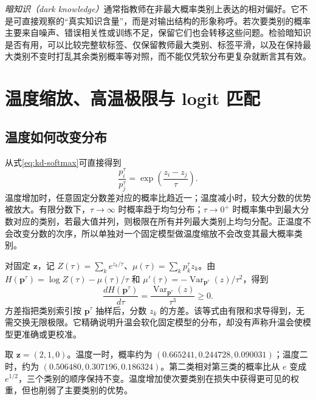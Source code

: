 \documentclass[UTF8,12pt,a4paper,fontset=fandol]{ctexart}
\begin{document}
\emph{暗知识（dark knowledge）}通常指教师在非最大概率类别上表达的相对偏好。它不是可直接观察的“真实知识含量”，而是对输出结构的形象称呼。若次要类别的概率主要来自噪声、错误相关性或训练不足，保留它们也会转移这些问题。检验暗知识是否有用，可以比较完整软标签、仅保留教师最大类别、标签平滑，以及在保持最大类别不变时打乱其余类别概率等对照，而不能仅凭软分布更复杂就断言其有效。

\section{温度缩放、高温极限与 logit 匹配}
\label{sec:kd-temperature}

\subsection{温度如何改变分布}
从式\eqref{eq:kd-softmax}可直接得到
\begin{equation}
 \frac{p_i^\tau}{p_j^\tau}=\exp\left(\frac{z_i-z_j}{\tau}\right).
 \label{eq:kd-odds}
\end{equation}
温度增加时，任意固定分数差对应的概率比趋近一；温度减小时，较大分数的优势被放大。有限分数下，$\tau\to\infty$ 时概率趋于均匀分布；$\tau\to0^+$ 时概率集中到最大分数对应的类别，若最大值并列，则极限在所有并列最大类别上均匀分配。正温度不会改变分数的次序，所以单独对一个固定模型做温度缩放不会改变其最大概率类别。

对固定 $\mathbf z$，记 $Z(\tau)=\sum_ke^{z_k/\tau}$、$\mu(\tau)=\sum_kp_k^\tau z_k$。由 $H(\mathbf p^\tau)=\log Z(\tau)-\mu(\tau)/\tau$ 和 $\mu'(\tau)=-\operatorname{Var}_{\mathbf p^\tau}(z)/\tau^2$，得到
\begin{equation}
 \frac{dH(\mathbf p^\tau)}{d\tau}
 =\frac{\operatorname{Var}_{\mathbf p^\tau}(z)}{\tau^3}\geq0.
 \label{eq:kd-entropy-temperature}
\end{equation}
方差指把类别索引按 $\mathbf p^\tau$ 抽样后，分数 $z_k$ 的方差。该等式由有限和求导得到，无需交换无限极限。它精确说明升温会软化固定模型的分布，却没有声称升温会使模型更准确或更校准。

\begin{example}[温度带来的软化]
取 $\mathbf z=(2,1,0)$。温度一时，概率约为 $(0.665241,0.244728,0.090031)$；温度二时，约为 $(0.506480,0.307196,0.186324)$。第二类相对第三类的概率比从 $e$ 变成 $e^{1/2}$，三个类别的顺序保持不变。温度增加使次要类别在损失中获得更可见的权重，但也削弱了主要类别的优势。
\end{example}
\end{document}
